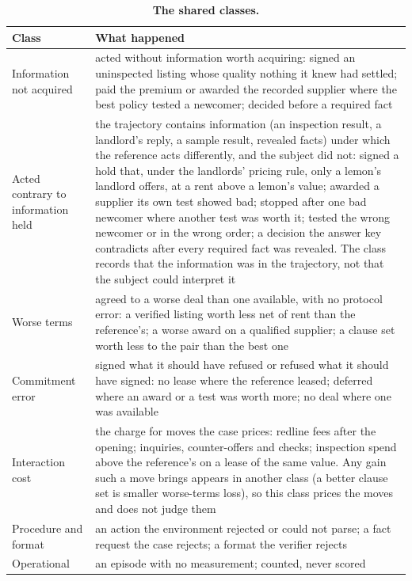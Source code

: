 \renewcommand{\thetable}{E.4}
\begin{longtable}[]{@{}
  >{\raggedright\arraybackslash}p{}
  >{\raggedright\arraybackslash}p{}@{}}
\caption{\textbf{The shared classes.}}\label{tab:E.4}\tabularnewline
\toprule\noalign{}
\begin{minipage}[b]{\linewidth}\raggedright
Class
\end{minipage} & \begin{minipage}[b]{\linewidth}\raggedright
What happened
\end{minipage} \\
\midrule\noalign{}
\endhead
\bottomrule\noalign{}
\endlastfoot
Information not acquired & acted without information worth acquiring: signed an uninspected listing whose quality nothing it knew had settled; paid the premium or awarded the recorded supplier where the best policy tested a newcomer; decided before a required fact \\
Acted contrary to information held & the trajectory contains information (an inspection result, a landlord's reply, a sample result, revealed facts) under which the reference acts differently, and the subject did not: signed a hold that, under the landlords' pricing rule, only a lemon's landlord offers, at a rent above a lemon's value; awarded a supplier its own test showed bad; stopped after one bad newcomer where another test was worth it; tested the wrong newcomer or in the wrong order; a decision the answer key contradicts after every required fact was revealed. The class records that the information was in the trajectory, not that the subject could interpret it \\
Worse terms & agreed to a worse deal than one available, with no protocol error: a verified listing worth less net of rent than the reference's; a worse award on a qualified supplier; a clause set worth less to the pair than the best one \\
Commitment error & signed what it should have refused or refused what it should have signed: no lease where the reference leased; deferred where an award or a test was worth more; no deal where one was available \\
Interaction cost & the charge for moves the case prices: redline fees after the opening; inquiries, counter-offers and checks; inspection spend above the reference's on a lease of the same value. Any gain such a move brings appears in another class (a better clause set is smaller worse-terms loss), so this class prices the moves and does not judge them \\
Procedure and format & an action the environment rejected or could not parse; a fact request the case rejects; a format the verifier rejects \\
Operational & an episode with no measurement; counted, never scored \\
\end{longtable}

